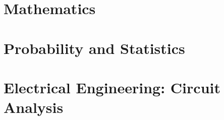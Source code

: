 \documentclass{article}
\newcommand{\LoadCheatsheet}[1]{{}}
\begin{document}
\thispagestyle{plain}
\MakeCustomTitle
\bigskip


\begin{center}%
    \parbox{0.7\textwidth}{\doclicenseThis}%
\end{center}

{
    \hypersetup{linkcolor=black}
    \tableofcontents
}

\newpage
{}

\section{Mathematics}
\label{sec:mathgeneral}

    \LoadCheatsheet{mathematics-general/03-linear-algebra}
    \newpage
    \LoadCheatsheet{mathematics-general/04-calculus}
    \newpage
    \LoadCheatsheet{mathematics-general/05-common-integrals}
    \newpage
    \LoadCheatsheet{mathematics-general/06-complex-analysis}
    \newpage
    \LoadCheatsheet{mathematics-general/07-differential-equations}

\newpage
\section{Probability and Statistics}
\label{sec:probability-and-statistics}

    \LoadCheatsheet{probability-and-statistics}

\newpage
\section{Electrical Engineering: Circuit Analysis}
\label{sec:ee-circuit-analysis}

    \LoadCheatsheet{electrical-engineering-circuit-analysis/1-dc-analysis}
    \newpage
    \LoadCheatsheet{electrical-engineering-circuit-analysis/2a-intro}
    \newpage
    \LoadCheatsheet{electrical-engineering-circuit-analysis/2b-magnetically-coupled-circuits}
    \newpage
    \LoadCheatsheet{electrical-engineering-circuit-analysis/2c-power}
    \newpage
    \LoadCheatsheet{electrical-engineering-circuit-analysis/3a-op-amps}
    \newpage
    \LoadCheatsheet{electrical-engineering-circuit-analysis/3b-semiconductors}
    \newpage
    \LoadCheatsheet{electrical-engineering-circuit-analysis/3c-feedback}
    \newpage
    \LoadCheatsheet{electrical-engineering-circuit-analysis/4a-non-linear-circuits}
    \newpage
    \LoadCheatsheet{electrical-engineering-circuit-analysis/5a-common-configs-transistor-amplifiers}
\end{document}
